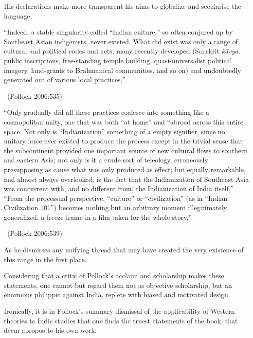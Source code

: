 His declarations make more transparent his aims to globalize and secularise the language,

\begin{myquote}
“Indeed, a stable singularity called “Indian culture,” so often conjured up by Southeast Asian indigenists, never existed. What did exist was only a range of cultural and political codes and acts, many recently developed (Sanskrit \textit{kāvya}, public inscriptions, free-standing temple building, quasi-universalist political imagery, land-grants to Brahmanical communities, and so on) and undoubtedly generated out of various local practices,” 

~\hfill (Pollock 2006:535)
\end{myquote}

\begin{myquote}
“Only gradually did all these practices coalesce into something like a cosmopolitan unity, one that was both “at home” and “abroad across this entire space. Not only is “Indianization” something of a empty signifier, since no unitary force ever existed to produce the process except in the trivial sense that the subcontinent provided one important source of new cultural flows to southern and eastern Asia; not only is it a crude sort of teleology, erroneously presupposing as cause what was only produced as effect; but equally remarkable, and almost always overlooked, is the fact that the Indianization of Southeast Asia was concurrent with, and no different from, the Indianization of India itself,” “From the processual perspective, “culture” or “civilization” (as in “Indian Civilization 101”) becomes nothing but an arbitrary moment illegitimately generalized, a freeze frame in a film taken for the whole story,” 

~\hfill (Pollock 2006:539) 
\end{myquote}

As he dismisses any unifying thread that may have created the very existence of this range in the first place.

Considering that a critic of Pollock’s acclaim and scholarship makes these statements, one cannot but regard them not as objective scholarship, but an enormous philippic against India, replete with biased and motivated design.

Ironically, it is in Pollock’s summary dismissal of the applicability of Western theories to Indic studies that one finds the truest statements of the book, that deem apropos to his own work:

